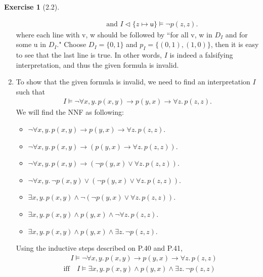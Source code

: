 \documentclass[12pt, psamsfonts]{amsart}
\theoremstyle{definition}
\newtheorem*{exer}{Exercise}
\theoremstyle{remark}
\numberwithin{equation}{subsection}
\begin{document}
\begin{exer}[2.2]
\begin{enumerate}[label=(\alph*)]
\begin{align*}
                                    &\quad \quad \quad \text{ and } I \vartriangleleft \{ z \mapsto \textsf{u} \} \models \neg p(z, z).
            \end{align*}
            where each line with \textsf{v}, \textsf{w} should be followed by ``for all \textsf{v}, \textsf{w} in $D_I$ and for some \textsf{u} in $D_I$."
            Choose $D_I = \{ 0, 1 \}$ and $p_I = \{ (0, 1), (1, 0) \}$, then it is easy to see that the last line is true.
            In other words, $I$ is indeed a falsifying interpretation, and thus the given formula is invalid.
        \item %
            To show that the given formula is invalid, we need to find an interpretation $I$ such that
            \begin{align*}
                I \models \neg\forall x, y.\, p(x, y) \rightarrow p(y, x) \rightarrow \forall z.\, p(z, z).
            \end{align*}
            We will find the NNF as following:
            \begin{itemize}
                \item
                    $\neg\forall x, y.\, p(x, y) \rightarrow p(y, x) \rightarrow \forall z.\, p(z, z)$.
                \item
                    $\neg\forall x, y.\, p(x, y) \rightarrow (p(y, x) \rightarrow \forall z.\, p(z, z))$.
                \item
                    $\neg\forall x, y.\, p(x, y) \rightarrow (\neg p(y, x) \lor \forall z.\, p(z, z))$.
                \item
                    $\neg\forall x, y.\, \neg p(x, y) \lor (\neg p(y, x) \lor \forall z.\, p(z, z))$.
                \item
                    $\exists x, y.\, p(x, y) \land \neg(\neg p(y, x) \lor \forall z.\, p(z, z))$.
                \item
                    $\exists x, y.\, p(x, y) \land p(y, x) \land \neg\forall z.\, p(z, z)$.
                \item
                    $\exists x, y.\, p(x, y) \land p(y, x) \land \exists z.\, \neg p(z, z)$.
            \end{itemize}
            Using the inductive steps described on P.40 and P.41,
            \begin{align*}
                &\quad I \models \neg\forall x, y.\, p(x, y) \rightarrow p(y, x) \rightarrow \forall z.\, p(z, z) \\
                    &\text{iff}\quad I \models \exists x, y.\, p(x, y) \land p(y, x) \land \exists z.\, \neg p(z, z) \\

\end{align*}
\end{enumerate}
\end{exer}
\end{document}
